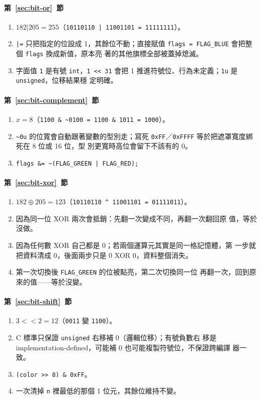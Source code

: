 \paragraph{第~\ref{sec:bit-or}~節}
\begin{enumerate}
\item $182 | 205 = 255$（\texttt{10110110 | 11001101 = 11111111}）。
\item \texttt{|=} 只把指定的位設成 1，其餘位不動；直接賦值
\texttt{flags = FLAG\_BLUE} 會把整個 \texttt{flags} 換成新值，原本亮
著的其他旗標全部被蓋掉熄滅。
\item 字面值 \texttt{1} 是有號 \texttt{int}，\texttt{1 << 31} 會把 1
推進符號位、行為未定義；\texttt{1u} 是 \texttt{unsigned}，位移結果穩
定明確。
\end{enumerate}

\paragraph{第~\ref{sec:bit-complement}~節}
\begin{enumerate}
\item $x = 8$（\texttt{1100 \& \~{}0100 = 1100 \& 1011 = 1000}）。
\item \texttt{\~{}0u} 的位寬會自動跟著變數的型別走；寫死
\texttt{0xFF}／\texttt{0xFFFF} 等於把遮罩寬度綁死在 8 位或 16 位，型
別更寬時高位會留下不該有的 0。
\item \texttt{flags \&= \~{}(FLAG\_GREEN | FLAG\_RED);}
\end{enumerate}

\paragraph{第~\ref{sec:bit-xor}~節}
\begin{enumerate}
\item $182 \oplus 205 = 123$（\texttt{10110110 \textasciicircum{}
11001101 = 01111011}）。
\item 因為同一位 XOR 兩次會抵銷：先翻一次變成不同，再翻一次翻回原
值，等於沒做。
\item 因為任何數 XOR 自己都是 0；若兩個運算元其實是同一格記憶體，第
一步就把資料清成 0，後面兩步只是 0 XOR 0，資料整個消失。
\item 第一次切換後 \texttt{FLAG\_GREEN} 的位被點亮，第二次切換同一位
再翻一次，回到原來的值——等於沒變。
\end{enumerate}

\paragraph{第~\ref{sec:bit-shift}~節}
\begin{enumerate}
\item $3 << 2 = 12$（\texttt{0011} 變 \texttt{1100}）。
\item C 標準只保證 \texttt{unsigned} 右移補 0（邏輯位移）；有號負數右
移是 implementation-defined，可能補 0 也可能複製符號位，不保證跨編譯
器一致。
\item \texttt{(color >> 8) \& 0xFF}。
\item 一次清掉 \texttt{n} 裡最低的那個 1 位元，其餘位維持不變。
\end{enumerate}

